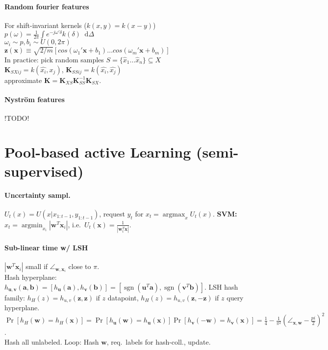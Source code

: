 \documentclass[9pt]{scrartcl}
\DeclareMathOperator{\sign}{sgn}
\DeclareMathOperator{\argmin}{argmin}
\DeclareMathOperator{\argmax}{argmax}
\newcommand*\diff{\mathop{}\!\mathrm{d}}
\begin{document}
\begin{twocolumn}
\paragraph{Random fourier features}
For shift-invariant kernels ($k(x, y) = k(x -y)$) \\
$p(\omega)=\frac{1}{2\pi}\int e^{-j\omega'\delta}k(\delta) \diff\Delta$ \\
$\omega_i \sim p, b_i \sim U(0, 2\pi) $\\
$\bm z(\bm x) \equiv \sqrt{2/m}[cos(\omega_1'\bm x+b_1) \dots cos(\omega_m'\bm x+b_m)]$ \\
In practice: pick random samples $S = \{\hat{x}_1 \dots \hat{x}_n\} \subseteq X$ \\
$\bm K_{SXij} = k(\hat{x_i}, x_j)$, $\bm K_{SSij} = k(\hat{x_i}, \hat{x_j})$ \\
approximate $\bm K = \bm K_{XS}\bm K_{SS}^{-1}\bm K_{SX}$.

\paragraph{Nyström features}
!TODO!

\section{Pool-based active Learning (semi-supervised)}

\paragraph{Uncertainty sampl.}
$U_t(x) = U(x | x_{1:t-1}, y_{1:t-1})$, request $y_t$ for $x_t = \argmax_x U_t(x)$.
\textbf{SVM:} $x_t = \argmin_{x_i}|\bm w^T\bm x_i|$, i.e.\ $U_t(\bm x) = \frac{1}{|\bm w_t^T \bm x|}$.

\paragraph{Sub-linear time w/ LSH}
$|\bm w^T\bm x_i|$ small if $\angle_{\bm w,\bm x_i}$ close to $\pi$.\\
Hash hyperplane:
$h_{\bm u,\bm v}(\bm a,\bm b) = [h_{\bm u}(\bm a), h_{\bm v}(\bm b)] = [\sign(\bm u^T\bm a),\sign(\bm v^T\bm b)]$.
LSH hash family: $h_H(z) = h_{u,v}(\bm z,\bm z)$ if $z$ datapoint, $h_H(z) = h_{u,v}(\bm z,-\bm z)$ if $z$ query hyperplane.
$\Pr[h_H(\bm w) = h_H(\bm x)] = \Pr[h_{\bm u}(\bm w) = h_{\bm u}(\bm x)]\Pr[h_{\bm v}(-\bm w) = h_{\bm v}(\bm x)] = \frac{1}{4} - \frac{1}{\pi^2}(\angle_{\bm x,\bm w} - \frac{pi}{2})^2$.\\
Hash all unlabeled. Loop: Hash $\bm w$, req.\ labels for hash-coll., update.


\end{twocolumn}
\end{document}
